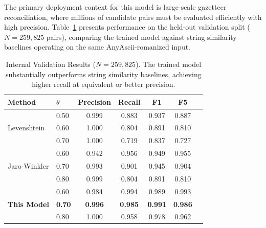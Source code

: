 \documentclass[11pt]{article}
\begin{document}
    The primary deployment context for this model is large-scale gazetteer reconciliation,
    where millions of candidate pairs must be evaluated efficiently with high precision.
    Table~\ref{tab:val_results} presents performance on the held-out validation split
    ($N=259,825$ pairs), comparing the trained model against string similarity baselines
    operating on the same AnyAscii-romanized input.

    \begin{table}[h]
        \centering
        \caption{Internal Validation Results ($N=259,825$). The trained model substantially
        outperforms string similarity baselines, achieving higher recall at equivalent or
        better precision.}
        \label{tab:val_results}
        \begin{tabular}{llccccc}
            \toprule
            \textbf{Method} & \textbf{$\theta$} & \textbf{Precision} & \textbf{Recall} & \textbf{F1} & \textbf{F5} \\
            \midrule
            \multirow{3}{*}{Levenshtein}
            & 0.50              & 0.999              & 0.883           & 0.937          & 0.887          \\
            & 0.60              & 1.000              & 0.804           & 0.891          & 0.810          \\
            & 0.70              & 1.000              & 0.719           & 0.837          & 0.727          \\
            \midrule
            \multirow{3}{*}{Jaro-Winkler}
            & 0.60              & 0.942              & 0.956           & 0.949          & 0.955          \\
            & 0.70              & 0.993              & 0.901           & 0.945          & 0.904          \\
            & 0.80              & 0.999              & 0.804           & 0.891          & 0.810          \\
            \midrule
            \multirow{3}{*}{\textbf{This Model}}
            & 0.60              & 0.984              & 0.994           & 0.989          & 0.993          \\
            & \textbf{0.70}     & \textbf{0.996}     & \textbf{0.985}  & \textbf{0.991} & \textbf{0.986} \\
            & 0.80              & 1.000              & 0.958           & 0.978          & 0.962          \\
            \bottomrule
        \end{tabular}
    \end{table}
\end{document}

